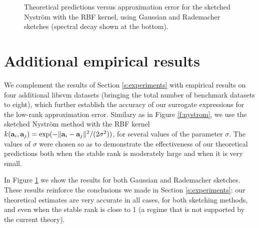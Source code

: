 \documentclass[thesis.tex]{subfiles}
\begin{document}
\begin{figure}
  \caption{Theoretical predictions versus approximation error for the
    sketched Nystr\"om with the RBF kernel, using Gaussian and
    Rademacher sketches (spectral decay shown at the bottom).}\label{f:nystrom2}
\end{figure}

\section{Additional empirical results}
\label{a:experiments}

We complement the results of Section \ref{s:experiments} with
empirical results on four additional libsvm datasets \cite{libsvm} (bringing
the total number of benchmark datasets to eight), which further
establish the accuracy of our surrogate expressions for the low-rank approximation
error. Similary as in Figure \ref{f:nystrom}, we use the sketched
Nystr\"om method \cite{revisiting-nystrom} with the RBF kernel
$k(\mathbf a_i,\mathbf a_j)=\exp(-\|\mathbf a_i-\mathbf a_j\|^2/(2\sigma^2))$, for several values
of the parameter $\sigma$. The values of $\sigma$ were chosen so as to
demonstrate the effectiveness of our theoretical predictions both when the
stable rank is moderately large and when it is very small.

In Figure \ref{f:nystrom2} we show the results for both Gaussian and
Rademacher sketches. These results reinforce the conclusions we made in
Section \ref{s:experiments}: our theoretical estimates are very
accurate in all cases, for both sketching methods, and even when the
stable rank is close to 1 (a regime that is not supported by the
current theory).
\end{document}
